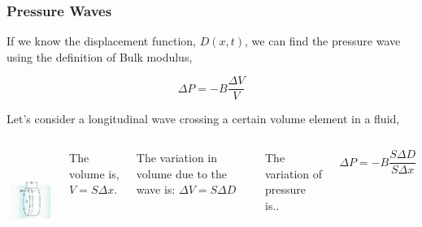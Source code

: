 \documentclass[]{beamer}
\begin{document}
\begin{frame}
\frametitle{Pressure Waves}
If we know the displacement function, $D(x,t)$, we can find the pressure wave using the definition of Bulk modulus,

\pause

\begin{equation*}
\Delta P=-B\frac{\Delta V}{V}
\end{equation*}

\pause

Let's consider a longitudinal wave crossing a certain volume element in a fluid,
\pause

   \begin{columns}[c]
   \column{1.8in}  %
  
  \begin{center}
  \includegraphics[height=1.3in]{images4/Pressurewave.jpg}
\end{center}

   \column{2.2in}
The volume is, $V=S\Delta x$.
\pause
\vspace{2mm}

The variation in volume due to the wave is: $\Delta V=S\Delta D$
\pause
\vspace{2mm}

The variation of pressure is..



\begin{equation}
\Delta P=-B\frac{S\Delta D}{S\Delta x}
\end{equation}


   \end{columns}




  \end{frame}
\end{document}
